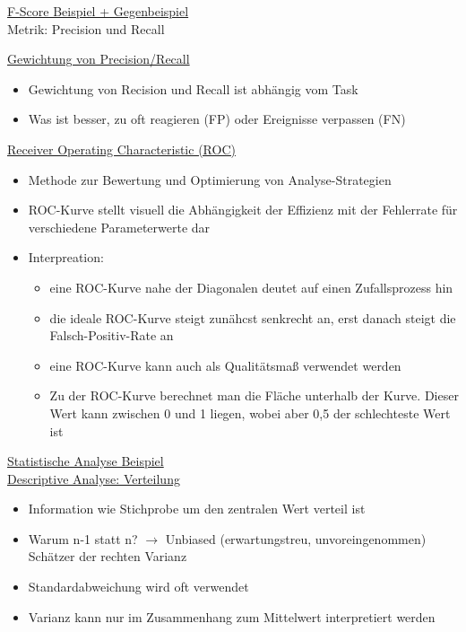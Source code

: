 \documentclass[a4paper,10pt,oneside]{article}
\begin{document}
\underline{F-Score Beispiel + Gegenbeispiel} \\
 Metrik: Precision und Recall
 
\underline{Gewichtung von Precision/Recall} \\
 	\begin{itemize}
 		\item Gewichtung von Recision und Recall ist abhängig vom Task
 		\item Was ist besser, zu oft reagieren (FP) oder Ereignisse verpassen (FN)
 	\end{itemize}
 	
\underline{Receiver Operating Characteristic (ROC)} \\
 	\begin{itemize}
 		\item Methode zur Bewertung und Optimierung von Analyse-Strategien
 		\item ROC-Kurve stellt visuell die Abhängigkeit der Effizienz mit der Fehlerrate für verschiedene Parameterwerte dar
 		\item Interpreation:
 			\begin{itemize}
 				\item eine ROC-Kurve nahe der Diagonalen deutet auf einen Zufallsprozess hin
 				\item die ideale ROC-Kurve steigt zunähcst senkrecht an, erst danach steigt die Falsch-Positiv-Rate an
 				\item eine ROC-Kurve kann auch als Qualitätsmaß verwendet werden
 				\item Zu der ROC-Kurve berechnet man die Fläche unterhalb der Kurve. Dieser Wert kann zwischen 0 und 1 liegen, wobei aber 0,5 der schlechteste Wert ist
 			\end{itemize}
 	\end{itemize}
 	
\underline{Statistische Analyse Beispiel} \\
 	
\underline{Descriptive Analyse: Verteilung} \\
	\begin{itemize}
		\item Information wie Stichprobe um den zentralen Wert verteil ist
		\item Warum n-1 statt n? $\rightarrow$ Unbiased (erwartungstreu, unvoreingenommen) Schätzer der rechten Varianz
		\item Standardabweichung wird oft verwendet
		\item Varianz kann nur im Zusammenhang zum Mittelwert interpretiert werden
	\end{itemize}
	
\end{document}
